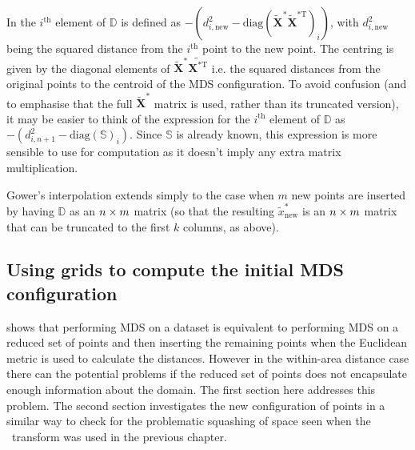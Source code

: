 In  the $i^\text{th}$ element of $\mathbb{D}$ is defined as $-(d^2_{i,\text{new}}-\text{diag}(\mathbf{\tilde{X}}^* \mathbf{\tilde{X}}^{*\text{T}})_i)$\label{cor-4s2}, with $d^2_{i,\text{new}}$ being the squared distance from the $i^\text{th}$ point to the new point. The centring is given by the diagonal elements of $\tilde{\mathbf{X}}^*\tilde{\mathbf{X}^{* \text{T}}}$ i.e. the squared distances from the original points to the centroid of the MDS configuration. To avoid confusion (and to emphasise that the full $\tilde{\mathbf{X}}^*$ matrix is used, rather than its truncated version), it may be easier to think of the expression for the $i^\text{th}$ element of $\mathbb{D}$ as $-(d^2_{i,n+1}-\text{diag}(\mathbb{S})_i)$\label{cor-r31-5-2}. Since $\mathbb{S}$ is already known, this expression is more sensible to use for computation as it doesn't imply any extra matrix multiplication.

Gower's interpolation extends simply to the case when $m$ new points are inserted by having $\mathbb{D}$ as an $n \times m$ matrix (so that the resulting $\tilde{x}^*_{\text{new}}$ is an $n\times m$ matrix that can be truncated to the first $k$ columns, as above).


\subsection{Using grids to compute the initial MDS configuration}

 shows that performing MDS on a dataset is equivalent to performing MDS on a reduced set of points and then inserting the remaining points when the Euclidean metric is used to calculate the distances\label{cor-r31-6}. However in the within-area distance case there can the potential problems if the reduced set of points does not encapsulate enough information about the domain. The first section here addresses this problem. The second section investigates the new configuration of points \label{cor-r31-7}in a similar way to check for the problematic squashing of space seen when the \sch\ transform was used in the previous chapter.

\label{grids}

